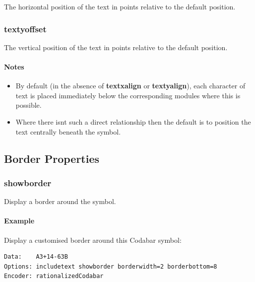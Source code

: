 The horizontal position of the text in points relative to the default
position.

\hypertarget{textyoffset}{%
\subsubsection{textyoffset}\label{textyoffset}}

The vertical position of the text in points relative to the default
position.

\hypertarget{notes-5}{%
\paragraph{Notes}\label{notes-5}}

\begin{itemize}
\tightlist
\item
  By default (in the absence of \textbf{textxalign} or
  \textbf{textyalign}), each character of text is placed immediately
  below the corresponding modules where this is possible.
\item
  Where there isn\textquotesingle t such a direct relationship then the
  default is to position the text centrally beneath the symbol.
\end{itemize}

\hypertarget{border-properties}{%
\subsection{Border Properties}\label{border-properties}}

\hypertarget{showborder}{%
\subsubsection{showborder}\label{showborder}}

Display a border around the symbol.

\hypertarget{example-35}{%
\paragraph{Example}\label{example-35}}

Display a customised border around this Codabar symbol:

\begin{verbatim}
Data:    A3+14-63B
Options: includetext showborder borderwidth=2 borderbottom=8
Encoder: rationalizedCodabar
\end{verbatim}

